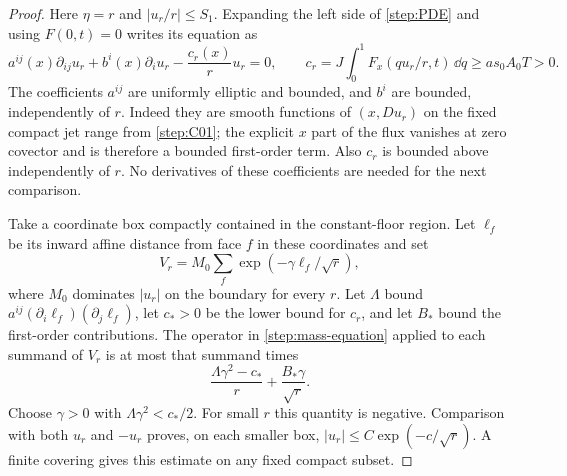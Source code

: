 \begin{proof}
Here $\eta=r$ and $|u_r/r|\le S_1$.  Expanding the left side of
\cref{step:PDE} and using $F(0,t)=0$ writes its equation as
\begin{equation}\label{step:mass-equation}
 a^{ij}(x)\partial_{ij}u_r+b^i(x)\partial_i u_r
 -\frac{c_r(x)}r u_r=0,
 \qquad
 c_r=J\int_0^1F_x(qu_r/r,t)\,\dd q\ge as_0A_0T>0.
\end{equation}
The coefficients $a^{ij}$ are uniformly elliptic and bounded, and $b^i$
are bounded, independently of $r$.  Indeed they are smooth functions of
$(x,Du_r)$ on the fixed compact jet range from \cref{step:C01}; the
explicit $x$ part of the flux vanishes at zero covector and is therefore
a bounded first-order term.  Also $c_r$ is bounded above independently
of $r$.  No derivatives of these coefficients are needed for the next
comparison.

Take a coordinate box compactly contained in the constant-floor region.
Let $\ell_f$ be its inward affine distance from face $f$ in these
coordinates and set
\[
 V_r=M_0\sum_f\exp(-\gamma\ell_f/\sqrt r),
\]
where $M_0$ dominates $|u_r|$ on the boundary for every $r$.
Let $\Lambda$ bound $a^{ij}(\partial_i\ell_f)(\partial_j\ell_f)$,
let $c_*>0$ be the lower bound for $c_r$, and let $B_*$ bound the
first-order contributions.  The operator in \cref{step:mass-equation}
applied to each summand of $V_r$ is at most that summand times
\[
 \frac{\Lambda\gamma^2-c_*}{r}+\frac{B_*\gamma}{\sqrt r}.
\]
Choose $\gamma>0$ with $\Lambda\gamma^2<c_*/2$.  For small $r$ this
quantity is negative.  Comparison with both $u_r$ and $-u_r$ proves,
on each smaller box, $|u_r|\le C\exp(-c/\sqrt r)$.  A finite covering
gives this estimate on any fixed compact subset.


\end{proof}
